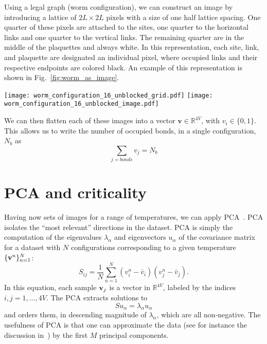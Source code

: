 \documentclass[../main.tex]{subfiles}
\begin{document}
Using a legal graph (worm configuration), we can construct an image by introducing a lattice of $2L\times2L$  pixels
with a size of one half lattice spacing.  One quarter of these pixels are attached to the sites, one quarter to the
horizontal links and one quarter to the vertical links. The remaining quarter are in the middle of the plaquettes and
always white.  In this representation, each site, link, and plaquette are designated an individual pixel, where
occupied links and their respective endpoints are colored black.  An example of this representation is shown in
Fig.~\ref{fig:worm_as_image}.
%
\begin{figure*}[htpb]
    \centering
    \texttt{[image: worm\_configuration\_16\_unblocked\_grid.pdf]}\hfill
    \texttt{[image: worm\_configuration\_16\_unblocked\_image.pdf]}
    \caption{(a) Legal worm configuration on an $L \times L$ lattice with periodic boundary conditions and; (b) its
    equivalent representation as a $2L\times2L$ black and white pixel image.}
    \label{fig:worm_as_image}
\end{figure*}
%
We can then flatten each of these images into a vector $\mathbf{v} \in
\mathbb{R}^{4V}$, with $v_i \in \{0, 1\}$. This allows us to write the number
of occupied bonds, in a single configuration, $N_b$ as
\begin{equation}
    \sum_{j = bonds} v_j = N_b
    \label{eq:link_sum}
\end{equation}

\section{PCA and criticality}%
\label{sec:pca}

Having now sets of images for a range of temperatures, we can apply PCA~\cite{Bishop}.  PCA isolates the ``most
relevant'' directions in the dataset.  PCA is simply the computation of the eigenvalues $\lambda_\alpha$ and
eigenvectors $u_\alpha$ of the covariance matrix for a dataset with $N$ configurations corresponding to a given
temperature $\{ {\bf v}^n \}_{n=1}^N$:
%
\begin{equation}
S_{ij} = \frac{1}{N} \sum_{n=1}^N (v_{i}^n - {\bar v}_i)
(v_{j}^n - {\bar v}_j).
\end{equation}
%
In this equation, each sample ${\bf v}_j$ is a vector in $\mathbb{R}^{4V}$, labeled by the indices $i,j = 1,\ldots,4V$.
The PCA extracts solutions to
\begin{equation}
S u_\alpha = \lambda_\alpha u_\alpha
\end{equation}
and orders them, in descending magnitude of $\lambda_\alpha$, which are all non-negative. The usefulness of PCA is that
one can approximate the data (see for instance the discussion in~\cite{Bishop}) by the first $M$ principal components. 
\end{document}
